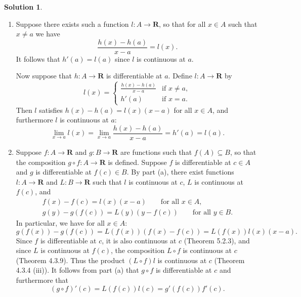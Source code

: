 \documentclass[12pt]{article}
\theoremstyle{definition}
\theoremstyle{exercise}
\theoremstyle{solution}
\newtheorem*{solution}{Solution}
\newcommand{\R}{\mathbf{R}}
\begin{document}
\begin{solution}
    \begin{enumerate}
        \item Suppose there exists such a function \( l : A \to \R \), so that for all \( x \in A \) such that \( x \neq a \) we have
        \[
            \frac{h(x) - h(a)}{x - a} = l(x).
        \]
        It follows that \( h'(a) = l(a) \) since \( l \) is continuous at \( a \).

        Now suppose that \( h : A \to \R \) is differentiable at \( a \). Define \( l : A \to \R \) by
        \[
            l(x) = \begin{cases}
                \frac{h(x) - h(a)}{x - a} & \text{if } x \neq a, \\
                h'(a) & \text{if } x = a.
            \end{cases}
        \]
        Then \( l \) satisfies \( h(x) - h(a) = l(x) (x - a) \) for all \( x \in A \), and furthermore \( l \) is continuous at \( a \):
        \[
            \lim_{x \to a} l(x) = \lim_{x \to a} \frac{h(x) - h(a)}{x - a} = h'(a) = l(a).
        \]

        \item Suppose \( f : A \to \R \) and \( g : B \to \R \) are functions such that \( f(A) \subseteq B \), so that the composition \( g \circ f : A \to \R \) is defined. Suppose \( f \) is differentiable at \( c \in A \) and \( g \) is differentiable at \( f(c) \in B \). By part (a), there exist functions \( l : A \to \R \) and \( L : B \to \R \) such that \( l \) is continuous at \( c \), \( L \) is continuous at \( f(c) \), and
        \begin{gather*}
            f(x) - f(c) = l(x)(x - a) \qquad \text{for all } x \in A, \\
            g(y) - g(f(c)) = L(y)(y - f(c)) \qquad \text{for all } y \in B.
        \end{gather*}
        In particular, we have for all \( x \in A \):
        \[
            g(f(x)) - g(f(c)) = L(f(x))(f(x) - f(c)) = L(f(x))l(x)(x - a).
        \]
        Since \( f \) is differentiable at \( c \), it is also continuous at \( c \) (Theorem 5.2.3), and since \( L \) is continuous at \( f(c) \), the composition \( L \circ f \) is continuous at \( c \) (Theorem 4.3.9). Thus the product \( (L \circ f) l \) is continuous at \( c \) (Theorem 4.3.4 (iii)). It follows from part (a) that \( g \circ f \) is differentiable at \( c \) and furthermore that
        \[
            (g \circ f)'(c) = L(f(c))l(c) = g'(f(c)) f'(c).
        \]
    \end{enumerate}
\end{solution}
\end{document}
